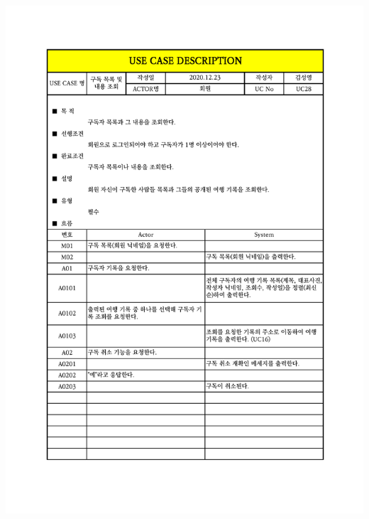 {{{{{{{{{{{{{{{{{{{{{{{{{{{{{{\includegraphics[width=1.1\textwidth]{./Figure/Design/Display/usecase/028.pdf} \\
}}}}}}}}}}}}}}}}}}}}}}}}}}}}}}
